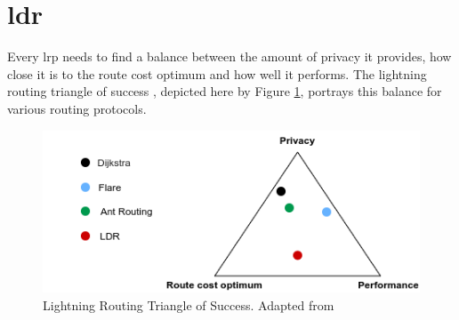 \section{\acrfull{ldr}}

Every \acrlong{lrp} needs to find a balance between the amount of privacy it provides, how close it is to the route cost optimum and how well it performs. The lightning routing triangle of success \cite{trampoline_routing_slides}, depicted here by Figure \ref{fig:triangle}, portrays this balance for various routing protocols.

\begin{figure}[H]
\begin{center}
   \includegraphics[width=0.9\linewidth]{images/triangle_paper.png}
  \caption{Lightning Routing Triangle of Success. Adapted from \cite{trampoline_routing_slides}}
  \label{fig:triangle}
  \end{center}
\end{figure}

